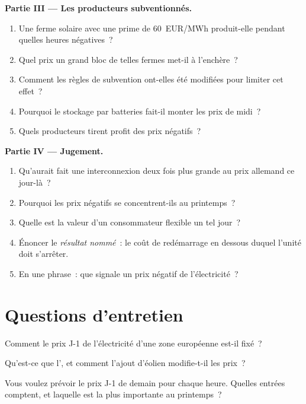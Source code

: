 \begin{problem}
\medskip\noindent\textbf{Partie III --- Les producteurs subventionnés.}
\begin{enumerate}[resume]
\item Une ferme solaire avec une prime de \qty{60}{EUR/MWh} produit-elle pendant quelles heures négatives~?
\item Quel prix un grand bloc de telles fermes met-il à l'enchère~?
\item Comment les règles de subvention ont-elles été modifiées pour limiter cet effet~?
\item Pourquoi le stockage par batteries fait-il monter les prix de midi~?
\item Quels producteurs tirent profit des prix négatifs~?
\end{enumerate}

\medskip\noindent\textbf{Partie IV --- Jugement.}
\begin{enumerate}[resume]
\item Qu'aurait fait une interconnexion deux fois plus grande au prix allemand ce jour-là~?
\item Pourquoi les prix négatifs se concentrent-ils au printemps~?
\item Quelle est la valeur d'un consommateur flexible un tel jour~?
\item Énoncer le \emph{résultat nommé}~: le coût de redémarrage en dessous duquel l'unité doit s'arrêter.
\item En une phrase~: que signale un prix négatif de l'électricité~?
\end{enumerate}
\end{problem}

\section{Questions d'entretien}

\begin{interviewq}\label{iq:m3:power-markets-design:1}
Comment le prix J-1 de l'électricité d'une zone européenne est-il fixé~?
\end{interviewq}

\begin{interviewq}\label{iq:m3:power-markets-design:2}
Qu'est-ce que l', et comment l'ajout d'éolien modifie-t-il les prix~?
\end{interviewq}

\begin{interviewq}\label{iq:m3:power-markets-design:3}
Vous voulez prévoir le prix J-1 de demain pour chaque heure. Quelles entrées comptent, et
laquelle est la plus importante au printemps~?
\end{interviewq}

